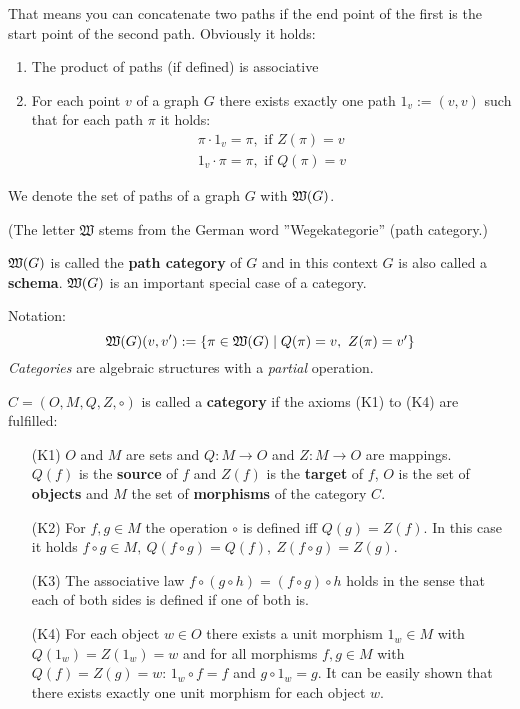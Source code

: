 That means you can concatenate two paths if the end point of the first is the
start point of the second path. Obviously it holds:
\begin{enumerate}
  \item The product of paths (if defined) is associative
  \item For each point $v$ of a graph $G$ there exists exactly one path $1_v :=
  (v, v)$ such that for each path $\pi$ it holds:
  	\begin{eqnarray*}
    	\pi \cdot 1_v = \pi,\text{ if }Z(\pi) = v \\
    	1_v \cdot \pi = \pi,\text{ if }Q(\pi) = v
  	\end{eqnarray*}
\end{enumerate}

We denote the set of paths of a graph $G$ with $\mbox{$\mathfrak{W}({G})$}$.

(The letter $\mathfrak{W}$ stems from the German word ''Wegekategorie'' (path
category.) 

$\mbox{$\mathfrak{W}({G})$}$ is called the {\bf path category} of $G$ and in this 
context $G$ is also called a {\bf schema}. $\mbox{$\mathfrak{W}({G})$}$ is an important special 
case of a category.

Notation: 
\[ \mbox{$\mathfrak{W}({G})$}(v, v') := \mbox{$\{\pi \in \mbox{$\mathfrak{W}({G})$} \mid Q(\pi) = v,\ Z(\pi) =
v'\}$}
\]
{\em Categories} are algebraic structures with a {\em partial} operation.

\bigskip
\begin{definition}
$C = (O, M, Q, Z, \circ)$ is called a {\bf category} if the axioms (K1) to
(K4) are fulfilled:
\begin{enumerate}
  \item[(K1)] $O$ and $M$ are sets and $Q: M \to O$ and $Z: M \to O$ are
  mappings.\\
  $Q(f)$ is the {\bf source} of $f$ and $Z(f)$ is the {\bf target} of $f$, $O$
  is the set of {\bf objects} and $M$ the set of {\bf morphisms} of the category $C$.
  \item[(K2)] For $f, g \in M$ the operation $\circ$ is defined iff $Q(g) =
  Z(f)$. In this case it holds $f \circ g \in M,\ Q(f \circ g) = Q(f),\ Z(f
  \circ g) = Z(g)$.
  \item[(K3)] The associative law $f \circ (g \circ h) = (f \circ g) \circ h$
  holds in the sense that each of both sides is defined if one of both is.
  \item[(K4)] For each object $w \in O$ there exists a unit morphism $1_w \in M$
  with $Q(1_w) = Z(1_w) = w$ and for all morphisms $f, g \in M$ with $Q(f) =
  Z(g) = w$: $1_w \circ f = f$ and $g \circ 1_w = g$. It can be easily shown
  that there exists exactly one unit morphism for each object $w$.
\end{enumerate}
\end{definition}

